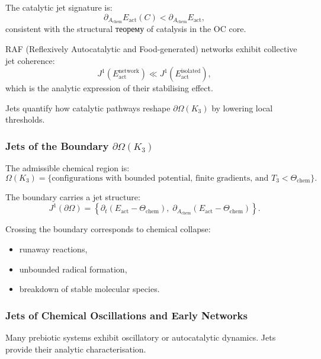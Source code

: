 The catalytic jet signature is:
\[
\partial_{A_{\mathrm{chem}}}E_{\mathrm{act}}(C)
<
\partial_{A_{\mathrm{chem}}}E_{\mathrm{act}},
\]
consistent with the structural теорему of catalysis in the OC core.

RAF (Reflexively Autocatalytic and Food-generated) networks exhibit
collective jet coherence:
\[
J^1(E_{\mathrm{act}}^{\mathrm{network}})
\ll
J^1(E_{\mathrm{act}}^{\mathrm{isolated}}),
\]
which is the analytic expression of their stabilising effect.

Jets quantify how catalytic pathways reshape $\partial\Omega(K_3)$ by
lowering local thresholds.



\subsubsection{Jets of the Boundary \texorpdfstring{\texorpdfstring{$\partial\Omega(K_3)$}{\partial\Omega(K_3)}}{Boundary}}

The admissible chemical region is:
\[
\Omega(K_3)=
\{
\text{configurations with bounded potential, finite gradients, and }
T_3 < \Theta_{\mathrm{chem}}
\}.
\]

The boundary carries a jet structure:
\[
J^1(\partial\Omega)=
\left\{
\partial_t(E_{\mathrm{act}}-\Theta_{\mathrm{chem}}),\;
\partial_{A_{\mathrm{chem}}}(E_{\mathrm{act}}-\Theta_{\mathrm{chem}})
\right\}.
\]

Crossing the boundary corresponds to chemical collapse:

\begin{itemize}
    \item runaway reactions,
    \item unbounded radical formation,
    \item breakdown of stable molecular species.
\end{itemize}



\subsubsection{Jets of Chemical Oscillations and Early Networks}

Many prebiotic systems exhibit oscillatory or autocatalytic dynamics.
Jets provide their analytic characterisation.

